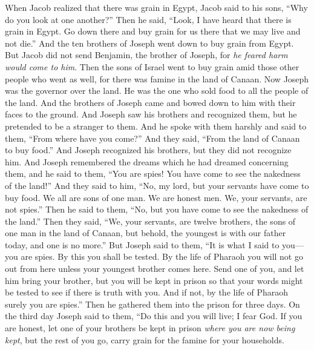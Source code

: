 \begin{biblechapter} %
 When Jacob realized that there was grain in Egypt, Jacob said to his sons, “Why do you look at one another?”
\verse Then he said, “Look, I have heard that there is grain in Egypt. Go down there and buy grain for us there that we may live and not die.”
\verse And the ten brothers of Joseph went down to buy grain from Egypt.
\verse But Jacob did not send Benjamin, the brother of Joseph, for \textit{he feared harm would come to him}.
\verse Then the sons of Israel went to buy grain amid those other people who went as well, for there was famine in the land of Canaan.
\verse Now Joseph was the governor over the land. He was the one who sold food to all the people of the land. And the brothers of Joseph came and bowed down to him with their faces to the ground.
\verse And Joseph saw his brothers and recognized them, but he pretended to be a stranger to them. And he spoke with them harshly and said to them, “From where have you come?” And they said, “From the land of Canaan to buy food.”
\verse And Joseph recognized his brothers, but they did not recognize him.
\verse And Joseph remembered the dreams which he had dreamed concerning them, and he said to them, “You are spies! You have come to see the nakedness of the land!”
\verse And they said to him, “No, my lord, but your servants have come to buy food.
\verse We all are sons of one man. We are honest men. We, your servants, are not spies.”
\verse Then he said to them, “No, but you have come to see the nakedness of the land.”
\verse Then they said, “We, your servants, are twelve brothers, the sons of one man in the land of Canaan, but behold, the youngest is with our father today, and one is no more.”
\verse But Joseph said to them, “It is what I said to you—you are spies.
\verse By this you shall be tested. By the life of Pharaoh you will not go out from here unless your youngest brother comes here.
\verse Send one of you, and let him bring your brother, but you will be kept in prison so that your words might be tested to see if there is truth with you. And if not, by the life of Pharaoh surely you are spies.”
\verse Then he gathered them into the prison for three days.
\verse On the third day Joseph said to them, “Do this and you will live; I fear God.
\verse If you are honest, let one of your brothers be kept in prison \textit{where you are now being kept}, but the rest of you go, carry grain for the famine for your households.

\end{biblechapter}
